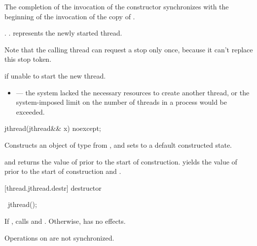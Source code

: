 \begin{itemdescr}
\pnum\sync The completion of the invocation of the constructor
synchronizes with the beginning of the invocation of the copy of .

\pnum\postconditions {}.
{\color{diffcolor}
                     .
}
                      represents the newly started thread.
{\color{diffcolor}
\begin{note} Note that the calling thread can request a stop only once,
                because it can't replace this stop token.  \end{note}
}%

\pnum\throws {} if unable to start the new thread.

\pnum\errors
\begin{itemize}
\item {} --- the system lacked the necessary
resources to create another thread, or the system-imposed limit on the number of
threads in a process would be exceeded.
\end{itemize}
\end{itemdescr}

%
\begin{itemdecl}
jthread(jthread&& x) noexcept;
\end{itemdecl}

\begin{itemdescr}
\pnum
\effects Constructs an object of type  from , and sets
 to a default constructed state.

\pnum
\postconditions {} and  returns the
value of  prior to the start of construction.
{\color{diffcolor}
 yields the value of  prior to the start of construction
and .
}%

\end{itemdescr}

[thread.jthread.destr]{ destructor}

%
\begin{itemdecl}
~jthread();
\end{itemdecl}

{\color{diffcolor}
\begin{itemdescr}
\pnum
If , calls  and .
Otherwise, has no effects.
\begin{note} Operations on  are not synchronized. \end{note}
\end{itemdescr}
}%

